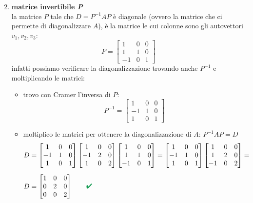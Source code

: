\documentclass[italian]{article}
\renewcommand{\checkmark}{\textcolor{ForestGreen}{\text{$\qquad$\ding{52}}}}
\begin{document}
\begin{enumerate}[label=\textbf{\alph*)}]
\begin{itemize}
\[			\]
		\end{itemize}
	\pagebreak
	\item \textbf{matrice invertibile \textit{P}}\\[1mm]
		la matrice $P$ tale che $D=P^{-1}AP$ è diagonale (ovvero la matrice che ci permette di diagonalizzare $A$), è la matrice le cui colonne sono gli autovettori $v_1,v_2,v_3$:
		\[
			P =
			\begin{bmatrix}
				1 & 0 & 0 \\
				1 & 1 &  0 \\
				-1 & 0 & 1
			\end{bmatrix}
		\]
		infatti possiamo verificare la diagonalizzazione trovando anche $P^{-1}$ e moltiplicando le matrici:
		\begin{itemize}
			\item trovo con Cramer l'inversa di $P$: \\[2mm]
				\[
					P^{-1} = 
					\begin{bmatrix}
						1 & 0 & 0 \\
						-1 & 1 & 0 \\
						1 & 0 & 1
					\end{bmatrix}
				\]
			\item moltiplico le matrici per ottenere la diagonalizzazione di $A$: $P^{-1}AP = D$
				\[
				\begin{split}
					D &= 
						\begin{bmatrix}
							1 & 0 & 0 \\
							-1 & 1 & 0 \\
							1 & 0 & 1
						\end{bmatrix}
						\begin{bmatrix}
							1 & 0 & 0 \\
							-1 & 2 & 0 \\
							1 & 0 & 2
						\end{bmatrix}
						\begin{bmatrix}
							1 & 0 & 0 \\
							1 & 1 &  0 \\
							-1 & 0 & 1
						\end{bmatrix}
						= 
						\begin{bmatrix}
							1 & 0 & 0 \\
							-1 & 1 & 0\\
							1 & 0 & 1
						\end{bmatrix}
						\begin{bmatrix}
							1 & 0 & 0 \\
							1 & 2 & 0\\
							-1 & 0 & 2
						\end{bmatrix} =
						\\[2mm]
						D &=
						\begin{bmatrix}
							1 & 0 & 0 \\
							0 & 2 & 0 \\
							0 & 0 & 2
						\end{bmatrix} 
						\checkmark
					\end{split}
				\]
		\end{itemize}
\end{enumerate}
\end{document}
